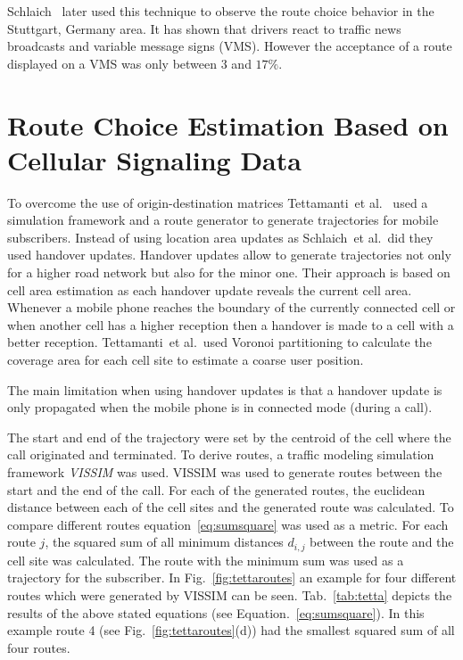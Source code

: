 Schlaich~\cite{Schlaich2010} later used this technique to observe the route choice behavior in the Stuttgart, Germany area. It has shown that drivers react to traffic news broadcasts and variable message signs (VMS). However the acceptance of a route displayed on a VMS was only between $3$ and $17\%$.

\section{Route Choice Estimation Based on Cellular Signaling Data}
To overcome the use of origin-destination matrices Tettamanti~et al.\ \cite{Tettamanti2012} used a simulation framework and a route generator to generate trajectories for mobile subscribers. Instead of using location area updates as Schlaich~et al.\ did they used handover updates. Handover updates allow to generate trajectories not only for a higher road network but also for the minor one. Their approach is based on cell area estimation as each handover update reveals the current cell area. Whenever a mobile phone reaches the boundary of the currently connected cell or when another cell has a higher reception then a handover is made to a cell with a better reception. Tettamanti~et al.\ used Voronoi partitioning to calculate the coverage area for each cell site to estimate a coarse user position.

The main limitation when using handover updates is that a handover update is only propagated when the mobile phone is in connected mode (during a call).

The start and end of the trajectory were set by the centroid of the cell where the call originated and terminated. To derive routes, a traffic modeling simulation framework \emph{VISSIM} was used. VISSIM was used to generate routes between the start and the end of the call. For each of the generated routes, the euclidean distance between each of the cell sites and the generated route was calculated. To compare different routes equation~\ref{eq:sumsquare} was used  as a metric. For each route $j$, the squared sum of all minimum distances $d_{i,j}$ between the route and the cell site was calculated. The route with the minimum sum was used as a trajectory for the subscriber.
In Fig.~\ref{fig:tettaroutes} an example for four different routes which were generated by VISSIM can be seen. Tab.~\ref{tab:tetta} depicts the results of the above stated equations (see Equation.\ \ref{eq:sumsquare}). In this example route 4 (see Fig.~\ref{fig:tettaroutes}(d)) had the smallest squared sum of all four routes. 

